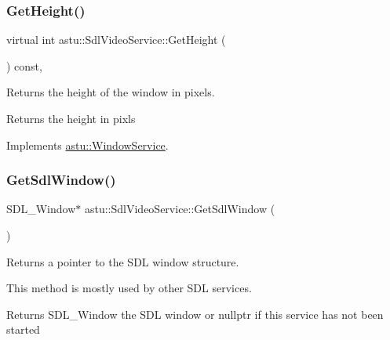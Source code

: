 \subsubsection{\texorpdfstring{Get\+Height()}{GetHeight()}}
{\footnotesize\ttfamily virtual int astu\+::\+Sdl\+Video\+Service\+::\+Get\+Height (\begin{DoxyParamCaption}{ }\end{DoxyParamCaption}) const\hspace{0.3cm}{\ttfamily [override]}, {\ttfamily [virtual]}}

Returns the height of the window in pixels.

\begin{DoxyReturn}{Returns}
the height in pixls 
\end{DoxyReturn}


Implements \hyperlink{classastu_1_1WindowService_a16d1880606a2c597162d8c80bed9d1a2}{astu\+::\+Window\+Service}.

\mbox{\label{classastu_1_1SdlVideoService_af0282450cc95c0cbc2a6add84603dd7a}} 
\subsubsection{\texorpdfstring{Get\+Sdl\+Window()}{GetSdlWindow()}}
{\footnotesize\ttfamily S\+D\+L\+\_\+\+Window$\ast$ astu\+::\+Sdl\+Video\+Service\+::\+Get\+Sdl\+Window (\begin{DoxyParamCaption}{ }\end{DoxyParamCaption})}

Returns a pointer to the S\+DL window structure.

This method is mostly used by other S\+DL services.

\begin{DoxyReturn}{Returns}
S\+D\+L\+\_\+\+Window the S\+DL window or {\ttfamily nullptr} if this service has not been started 
\end{DoxyReturn}
\mbox{\label{classastu_1_1SdlVideoService_ad6ee7f7a409960e91ddd77bbcea6432f}} 
